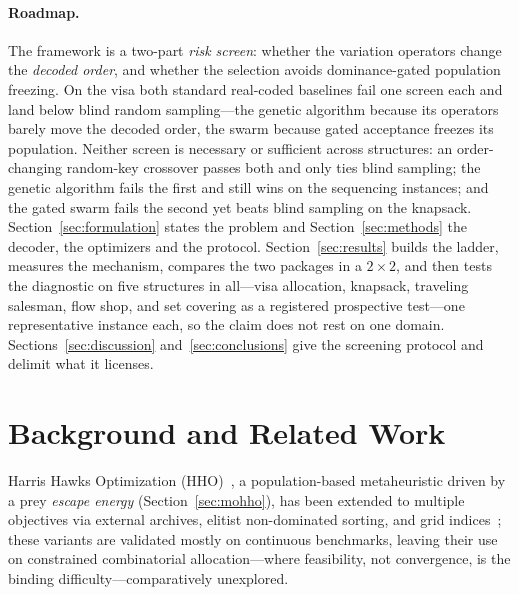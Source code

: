 \documentclass[runningheads]{llncs}
\begin{document}
\paragraph{Roadmap.}
The framework is a two-part \emph{risk screen}: whether the variation operators change the \emph{decoded order}, and whether the selection avoids dominance-gated population freezing. On the visa both standard real-coded baselines fail one screen each and land below blind random sampling---the genetic algorithm because its operators barely move the decoded order, the swarm because gated acceptance freezes its population. Neither screen is necessary or sufficient across structures: an order-changing random-key crossover passes both and only ties blind sampling; the genetic algorithm fails the first and still wins on the sequencing instances; and the gated swarm fails the second yet beats blind sampling on the knapsack. Section~\ref{sec:formulation} states the problem and Section~\ref{sec:methods} the decoder, the optimizers and the protocol. Section~\ref{sec:results} builds the ladder, measures the mechanism, compares the two packages in a $2\times2$, and then tests the diagnostic on five structures in all---visa allocation, knapsack, traveling salesman, flow shop, and set covering as a registered prospective test---one representative instance each, so the claim does not rest on one domain. Sections~\ref{sec:discussion} and~\ref{sec:conclusions} give the screening protocol and delimit what it licenses.

\section{Background and Related Work}
\label{sec:related}

Harris Hawks Optimization (HHO)~\cite{heidari}, a population-based metaheuristic driven by a prey \emph{escape energy} (Section~\ref{sec:mohho}), has been extended to multiple objectives via external archives, elitist non-dominated sorting, and grid indices~\cite{choo,jangir,cerci,kusoglu}; these variants are validated mostly on continuous benchmarks, leaving their use on constrained combinatorial allocation---where feasibility, not convergence, is the binding difficulty---comparatively unexplored.
\end{document}
